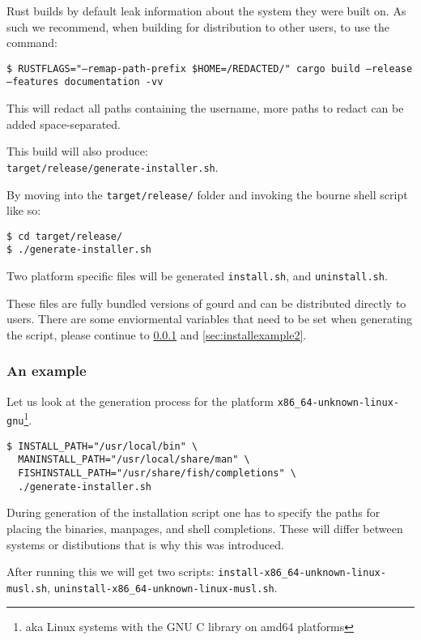 Rust builds by default leak information about the system they were built on.
As such we recommend, when building for distribution to other users, to use the command:

\texttt{\$ RUSTFLAGS="--remap-path-prefix \$HOME=/REDACTED/" cargo build --release --features documentation -vv}

This will redact all paths containing the username, more paths to redact can be added space-separated.

This build will also produce: \\
\texttt{target/release/generate-installer.sh}.

By moving into the \texttt{target/release/} folder and invoking the bourne shell script like so:

\begin{verbatim}
$ cd target/release/
$ ./generate-installer.sh
\end{verbatim}

Two platform specific files will be generated \texttt{install.sh}, and \texttt{uninstall.sh}.

These files are fully bundled versions of gourd and can be distributed directly to users.
There are some enviormental variables that need to be set when generating the script,
please continue to \ref{sec:installexample1} and \ref{sec:installexample2}.

\subsubsection{An example}
\label{sec:installexample1}

Let us look at the generation process for the platform \texttt{x86\_64-unknown-linux-gnu}\footnote{aka Linux systems with the GNU C library on amd64 platforms}.

\begin{verbatim}
$ INSTALL_PATH="/usr/local/bin" \
  MANINSTALL_PATH="/usr/local/share/man" \
  FISHINSTALL_PATH="/usr/share/fish/completions" \
  ./generate-installer.sh
\end{verbatim}

During generation of the installation script one has to specify the paths for placing the binaries, manpages, and shell completions.
These will differ between systems or distibutions that is why this was introduced.

After running this we will get two scripts: \texttt{install-x86\_64-unknown-linux-musl.sh}, \texttt{uninstall-x86\_64-unknown-linux-musl.sh}.

